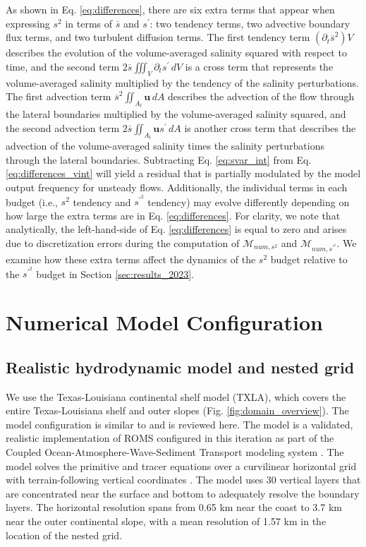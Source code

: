 As shown in Eq. \ref{eq:differences}, there are six extra terms that appear when expressing $s^2$ in terms of $\overline{s}$ and $s^{\prime}$: two tendency terms, two advective boundary flux terms, and two turbulent diffusion terms. The first tendency term $(\partial_t \overline{s}^2) V$ describes the evolution of the volume-averaged salinity squared with respect to time, and the second term $2\overline{s} \iiint_V \partial_t s^\prime \, dV$ is a cross term that represents the volume-averaged salinity multiplied by the tendency of the salinity perturbations. The first advection term $\overline{s}^2 \iint_{A_l} \mathbf{u} \, dA$ describes the advection of the flow through the lateral boundaries multiplied by the volume-averaged salinity squared, and the second advection term $2 \overline{s} \iint_{A_l} \textbf{u}s^{\prime} \, dA$ is another cross term that describes the advection of the volume-averaged salinity times the salinity perturbations through the lateral boundaries. Subtracting Eq. \ref{eq:svar_int} from Eq. \ref{eq:differences_vint} will yield a residual that is partially modulated by the model output frequency for unsteady flows. Additionally, the individual terms in each budget (i.e., $s^2$ tendency and $s^{\prime^2}$ tendency) may evolve differently depending on how large the extra terms are in Eq. \ref{eq:differences}. For clarity, we note that analytically, the left-hand-side of Eq. \ref{eq:differences} is equal to zero and arises due to discretization errors during the computation of $\mathcal{M}_{num, s^2}$ and $\mathcal{M}_{num, s^{\prime^2}}$.  We examine how these extra terms affect the dynamics of the $s^2$ budget relative to the $s^{\prime^2}$ budget in Section \ref{sec:results_2023}.

\section{Numerical Model Configuration} \label{sec:numerical}

\subsection{Realistic hydrodynamic model and nested grid}

We use the Texas-Louisiana continental shelf model (TXLA), which covers the entire Texas-Louisiana shelf and outer slopes (Fig. \ref{fig:domain_overview}). The model configuration is similar to \citet{Qu_2022_NIW} and is reviewed here. The model is a validated, realistic implementation of ROMS configured in this iteration as part of the Coupled Ocean-Atmosphere-Wave-Sediment Transport modeling system \citep{Warner_2010}. The model solves the primitive and tracer equations over a curvilinear horizontal grid with terrain-following vertical coordinates \citep{Arakawa_1977, shchepetkin2005regional, Zhang_2012_forecast}. The model uses 30 vertical layers that are concentrated near the surface and bottom to adequately resolve the boundary layers. The horizontal resolution spans from 0.65 km near the coast to 3.7 km near the outer continental slope, with a mean resolution of 1.57 km in the location of the nested grid. 

